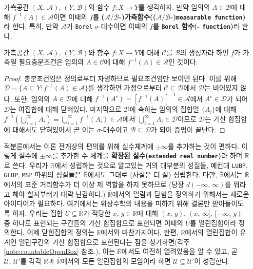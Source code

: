 \begin{definition}
    가측공간 $(X,\,\mathcal{A}),\,(Y,\,\mathcal{B})$와 함수 $f:X\to Y$를 생각하자. 만약 임의의 $A\in\mathcal{B}$에 대해 $f^{-1}(A)\in\mathcal{A}$이면 이때의 $f$를 \textbf{($\mathcal{A}/\mathcal{B}$-)가측함수(($\mathcal{A}/\mathcal{B}$-)\texttt{measurable function})}라 한다. 특히, 만약 $\mathcal{A}$가 \texttt{Borel} $\sigma$-대수이면 이때의 $f$를 \textbf{\texttt{Borel} 함수(- \texttt{function})}라 한다.
\end{definition}

\begin{theorem}\label{thm:generatorMeasurable}
    가측공간 $(X,\,\mathcal{A}),\,(Y,\,\mathcal{B})$와 함수 $f:X\to Y$에 대해 $\mathcal{C}$를 $\mathcal{B}$의 생성자라 하면 $f$가 가측일 필요충분조건은 임의의 $A\in\mathcal{C}$에 대해 $f^{-1}(A)\in\mathcal{A}$인 것이다.
\end{theorem}

\begin{proof}
    충분조건임은 정의로부터 자명하므로 필요조건임만 보이면 된다. 이를 위해 $\mathcal{D}=\{A\subseteq Y:f^{-1}(A)\in\mathcal{A}\}$를 생각하면 가정으로부터 $\mathcal{C}\subseteq\mathcal{D}$에서 $\mathcal{D}$는 비어있지 않다. 또한, 임의의 $A\in\mathcal{D}$에 대해 $f^{-1}(A^c)=[f^{-1}(A)]^{-1}\in\mathcal{A}$에서 $A^c\in\mathcal{D}$가 되어 $\mathcal{D}$는 여집합에 대해 닫혀있다. 마지막으로 $\mathcal{D}$에 속하는 임의의 집합열 $\{A_i\}$에 대해 $f^{-1}(\bigcup_{i=1}^\infty A_i)=\bigcup_{i=1}^\infty f^{-1}(A_i)\in\mathcal{A}$에서 $\bigcup_{i=1}^\infty A_i\in\mathcal{D}$이므로 $\mathcal{D}$는 가산 합집합에 대해서도 닫혀있어서 곧 이는 $\sigma$-대수이고 $\mathcal{B}\subseteq\mathcal{D}$가 되어 증명이 끝난다.
\end{proof}

적분론에서는 이론 전개상의 편의를 위해 실수체계에 $\pm\infty$를 추가하는 것이 편하다. 이렇게 실수에 $\pm\infty$를 추가한 수 체계를 \textbf{확장된 실수(\texttt{extended real number})}라 하며 $\overline{\mathbb{R}}$로 쓴다. 우리가 $\mathbb{R}$에서 성립하는 것으로 알고있는 거의 대부분의 성질들, 예컨대 \texttt{LUBP}, \texttt{GLBP}, \texttt{MSP} 따위의 성질들은 $\overline{\mathbb{R}}$에서도 그대로 (사실은 더 잘) 성립한다. 다만, $\overline{\mathbb{R}}$에서는 $\mathbb{R}$에서의 표준 거리함수가 더 이상 제 역할을 하지 못하므로 (당장 $d(-\infty,\,\infty)$를 뭐라고 해야 할지부터가 대략 난감하다.) $\overline{\mathbb{R}}$에서의 열림과 닫힘을 정의하기 위해서는 새로운 아이디어가 필요하다. 여기에서는 위상수학의 내용을 피하기 위해 결론만 받아들이도록 하자. 우리는 집합 $U\subseteq\overline{\mathbb{R}}$가 적당한 $x,\,y\in\mathbb{R}$에 대해 $(x,\,y),\,(x,\,\infty],\,[-\infty,\,y)$ 중 하나로 표현되는 구간들의 가산 합집합으로 표현되면 이때의 $U$를 열린집합이라 정의한다. 이제 닫힌집합의 정의는 $\mathbb{R}$에서와 마찬가지이다. 한편, $\mathbb{R}$에서의 열린집합이 유계인 열린구간의 가산 합집합으로 표현된다는 점을 상기하면(각주 \ref{note:countableOpenBox} 참조.), 이는 $\overline{\mathbb{R}}$에서도 여전히 열려있음을 알 수 있고, 곧 $\mathcal{U},\,\mathcal{U}'$를 각각 $\mathbb{R}$과 $\overline{\mathbb{R}}$에서의 모든 열린집합의 모임이라 하면 $\mathcal{U}\subseteq\mathcal{U}'$이 성립한다.\footnotemark

